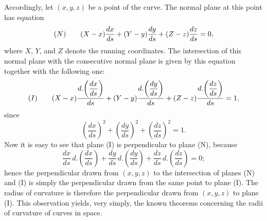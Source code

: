 Accordingly, let $(x,y,z)$ be a point of the curve. The normal plane at this
point has equation
\[
\begin{array}{@{}r@{\qquad}l@{}}
(N) & (X-x)\dfrac{dx}{ds}+(Y-y)\dfrac{dy}{ds}+(Z-z)\dfrac{dz}{ds}=0,
\end{array}
\]
where $X$, $Y$, and $Z$ denote the running coordinates. The intersection of
this normal plane with the consecutive normal plane is given by this equation
together with the following one:
\[
\begin{array}{@{}r@{\qquad}l@{}}
(I) & (X-x)\dfrac{d.\!\left(\dfrac{dx}{ds}\right)}{ds}
 +(Y-y)\dfrac{d.\!\left(\dfrac{dy}{ds}\right)}{ds}
 +(Z-z)\dfrac{d.\!\left(\dfrac{dz}{ds}\right)}{ds}=1,
\end{array}
\]
since
\[
\left(\frac{dx}{ds}\right)^2+
\left(\frac{dy}{ds}\right)^2+
\left(\frac{dz}{ds}\right)^2=1.
\]
Now it is easy to see that plane (I) is perpendicular to plane (N), because
\[
\frac{dx}{ds}\,d.\!\left(\frac{dx}{ds}\right)+
\frac{dy}{ds}\,d.\!\left(\frac{dy}{ds}\right)+
\frac{dz}{ds}\,d.\!\left(\frac{dz}{ds}\right)=0;
\]
hence the perpendicular drawn from $(x,y,z)$ to the intersection of planes
(N) and (I) is simply the perpendicular drawn from the same point to plane
(I). The radius of curvature is therefore the perpendicular drawn from
$(x,y,z)$ to plane (I). This observation yields, very simply, the known
theorems concerning the radii of curvature of curves in space.

\GalArticleEndRule
